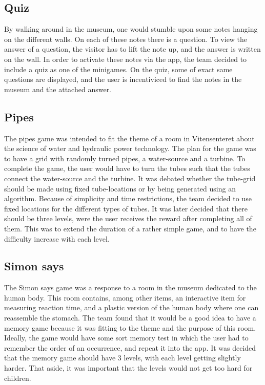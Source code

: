 \subsection{Quiz}
By walking around in the museum, one would stumble upon some notes hanging on the different walls. On each of these notes there is a question. To view the answer of a question, the visitor has to lift the note up, and the answer is written on the wall. In order to activate these notes via the app, the team decided to include a quiz as one of the minigames. On the quiz, some of exact same questions are displayed, and the user is incentiviced to find the notes in the museum and the attached answer.

\subsection{Pipes}
The pipes game was intended to fit the theme of a room in Vitensenteret about the science of water and hydraulic power technology. The plan for the game was to have a grid with randomly turned pipes, a water-source and a turbine. To complete the game, the user would have to turn the tubes such that the tubes connect the water-source and the turbine. It was debated whether the tube-grid should be made using fixed tube-locations or by being generated using an algorithm. Because of simplicity and time restrictions, the team decided to use fixed locations for the different types of tubes. It was later decided that there should be three levels, were the user receives the reward after completing all of them. This was to extend the duration of a rather simple game, and to have the difficulty increase with each level.

\subsection{Simon says}
The Simon says game was a response to a room in the museum dedicated to the human body. This room contains, among other items, an interactive item for measuring reaction time, and a plastic version of the human body where one can reassemble the stomach. The team found that it would be a good idea to have a memory game because it was fitting to the theme and the purpose of this room. Ideally, the game would have some sort memory test in which the user had to remember the order of an occurrence, and repeat it into the app. It was decided that the memory game should have 3 levels, with each level getting slightly harder. That aside, it was important that the levels would not get too hard for children. 

